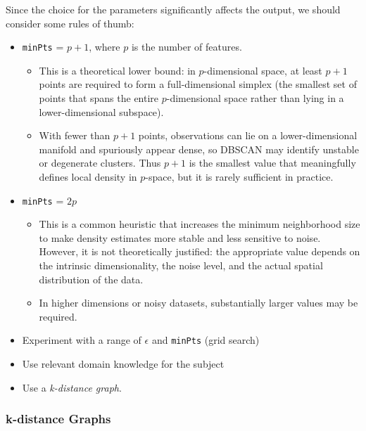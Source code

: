 Since the choice for the parameters significantly affects the output, we should consider some rules of thumb:
\begin{itemize}[label=--, itemsep=0.7em]
    \item \texttt{minPts} = $p + 1$, where $p$ is the number of features. 
    \begin{itemize}[label=$\circ$, itemsep=0.3em]
        \item This is a theoretical lower bound: in $p$-dimensional space, at least $p+1$ points are required to form a full-dimensional simplex (the smallest set of points that spans the entire $p$-dimensional space rather than lying in a lower-dimensional subspace). 
        \item With fewer than $p+1$ points, observations can lie on a lower-dimensional manifold and spuriously appear dense, so DBSCAN may identify unstable or degenerate clusters. Thus $p+1$ is the smallest value that meaningfully defines local density in $p$-space, but it is rarely sufficient in practice.
    \end{itemize}
    
    \item \texttt{minPts} = $2p$
    \begin{itemize}[label=$\circ$, itemsep=0.3em]
        \item This is a common heuristic that increases the minimum neighborhood size to make density estimates more stable and less sensitive to noise. However, it is not theoretically justified: the appropriate value depends on the intrinsic dimensionality, the noise level, and the actual spatial distribution of the data.
        \item In higher dimensions or noisy datasets, substantially larger values may be required.
    \end{itemize}
    \item Experiment with a range of $\epsilon$ and \texttt{minPts} (grid search)
    \item Use relevant domain knowledge for the subject
    \item Use a \textit{k-distance graph}.
\end{itemize}

\medskip

\subsubsection{k-distance Graphs}

\medskip


